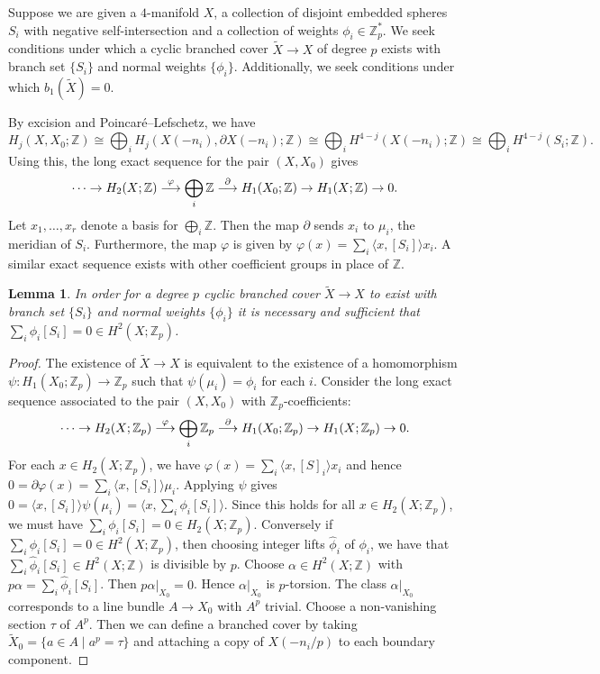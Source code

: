 \documentclass{amsart}
\newtheorem{lemma}[theorem]{Lemma}
\theoremstyle{definition}
\theoremstyle{remark}
\numberwithin{equation}{section}
\begin{document}
Suppose we are given a $4$-manifold $X$, a collection of disjoint embedded spheres $S_i$ with negative self-intersection and a collection of weights $\phi_i \in \mathbb{Z}_p^*$. We seek conditions under which a cyclic branched cover $\widetilde{X} \to X$ of degree $p$ exists with branch set $\{S_i\}$ and normal weights $\{ \phi_i \}$. Additionally, we seek conditions under which $b_1(\widetilde{X}) = 0$.

By excision and Poincar\'e--Lefschetz, we have
\[
H_j(X,X_0 ; \mathbb{Z}) \cong \bigoplus_i H_j( X(-n_i) , \partial X(-n_i) ; \mathbb{Z}) \cong \bigoplus_i H^{4-j}( X(-n_i) ; \mathbb{Z}) \cong \bigoplus_i H^{4-j}(S_i ; \mathbb{Z}).
\]
Using this, the long exact sequence for the pair $(X , X_0)$ gives
\[
\cdots \to H_2(X ; \mathbb{Z}) \buildrel \varphi \over \longrightarrow \bigoplus_i \mathbb{Z} \buildrel \partial \over \longrightarrow H_1(X_0 ; \mathbb{Z}) \to H_1(X ; \mathbb{Z})  \to 0.
\]
Let $x_1,\dots , x_r$ denote a basis for $\bigoplus_i \mathbb{Z}$. Then the map $\partial$ sends $x_i$ to $\mu_i$, the meridian of $S_i$. Furthermore, the map $\varphi$ is given by $\varphi(x) = \sum_i \langle x , [S_i] \rangle x_i$. A similar exact sequence exists with other coefficient groups in place of $\mathbb{Z}$.

\begin{lemma}\label{lem:bre}
In order for a degree $p$ cyclic branched cover $\widetilde{X} \to X$ to exist with branch set $\{S_i\}$ and normal weights $\{ \phi_i \}$ it is necessary and sufficient that $\sum_i \phi_i [S_i] = 0 \in H^2(X ; \mathbb{Z}_p)$.
\end{lemma}
\begin{proof}
The existence of $\widetilde{X} \to X$ is equivalent to the existence of a homomorphism $\psi : H_1(X_0 ; \mathbb{Z}_p) \to \mathbb{Z}_p$ such that $\psi( \mu_i ) = \phi_i$ for each $i$. Consider the long exact sequence associated to the pair $(X , X_0)$ with $\mathbb{Z}_p$-coefficients:
\[
\cdots \to H_2(X ; \mathbb{Z}_p) \buildrel \varphi \over \longrightarrow \bigoplus_i \mathbb{Z}_p \buildrel \partial \over \longrightarrow H_1(X_0 ; \mathbb{Z}_p) \to H_1(X ; \mathbb{Z}_p)  \to 0.
\]
For each $x \in H_2(X ; \mathbb{Z}_p)$, we have $\varphi(x) = \sum_i \langle x , [S]_i \rangle x_i$ and hence $0 = \partial \varphi(x) = \sum_i \langle x , [S_i] \rangle \mu_i$. Applying $\psi$ gives $0 = \langle x , [S_i] \rangle \psi(\mu_i) = \langle x , \sum_i \phi_i [S_i] \rangle$. Since this holds for all $x \in H_2(X ; \mathbb{Z}_p)$, we must have $\sum_i \phi_i [S_i] = 0 \in H_2(X ; \mathbb{Z}_p)$. Conversely if $\sum_i \phi_i [S_i] = 0 \in H^2(X ; \mathbb{Z}_p)$, then choosing integer lifts $\widehat{\phi}_i$ of $\phi_i$, we have that $\sum_i \widehat{\phi}_i [S_i] \in H^2(X ; \mathbb{Z})$ is divisible by $p$. Choose $\alpha \in H^2(X ; \mathbb{Z})$ with $p\alpha = \sum_i \widehat{\phi}_i [S_i]$. Then $p \alpha |_{X_0} = 0$. Hence $\alpha|_{X_0}$ is $p$-torsion. The class $\alpha|_{X_0}$ corresponds to a line bundle $A \to X_0$ with $A^p$ trivial. Choose a non-vanishing section $\tau$ of $A^p$. Then we can define a branched cover by taking $\widetilde{X}_0 = \{ a \in A \; | \; a^p = \tau \}$ and attaching a copy of $X(-n_i/p)$ to each boundary component.
\end{proof}
\end{document}
